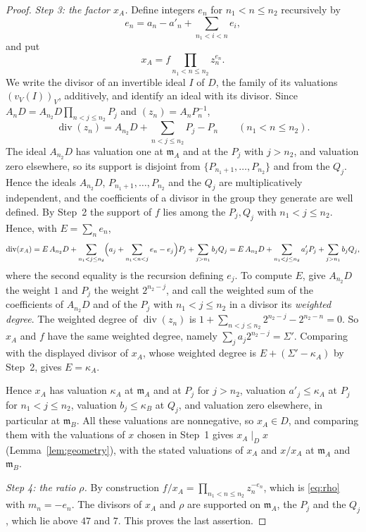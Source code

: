 \documentclass[11pt]{article}
\theoremstyle{plain}
\theoremstyle{definition}
\theoremstyle{remark}
\DeclareMathOperator{\divi}{div}
\newcommand{\EA}{\mathfrak m_A}
\newcommand{\EB}{\mathfrak m_B}
\begin{document}
\begin{proof}
\emph{Step 3: the factor $x_A$.}  Define integers $e_n$ for
$n_1<n\le n_2$ recursively by
\[
 e_n=a_n-a'_n+\sum_{n_1<i<n}e_i,
\]
and put
\[
 x_A=f\prod_{n_1<n\le n_2}z_n^{e_n}.
\]
We write the divisor of an invertible ideal $I$ of $D$, the family of its
valuations $(v_V(I))_V$, additively, and identify an ideal with its
divisor.  Since $A_nD=A_{n_2}D\prod_{n<j\le n_2}P_j$ and
$(z_n)=A_nP_n^{-1}$,
\[
 \divi(z_n)=A_{n_2}D+\sum_{n<j\leq n_2}P_j-P_n\qquad(n_1<n\leq n_2).
\]
The ideal $A_{n_2}D$ has valuation one at $\EA$ and at the $P_j$ with
$j>n_2$, and valuation zero elsewhere, so its support is disjoint from
$\{P_{n_1+1},\ldots,P_{n_2}\}$ and from the $Q_j$.  Hence the ideals
$A_{n_2}D$, $P_{n_1+1},\ldots,P_{n_2}$ and the $Q_j$ are multiplicatively
independent, and the coefficients of a divisor in the group they generate
are well defined.  By Step~2 the support of $f$ lies among
the $P_j,Q_j$ with $n_1<j\le n_2$.  Hence, with $E=\sum_ne_n$,
\[
 \divi(x_A)=E\,A_{n_2}D
   +\sum_{n_1<j\le n_2}\Bigl(a_j+\sum_{n_1<n<j}e_n-e_j\Bigr)P_j
   +\sum_{j>n_1}b_jQ_j
   =E\,A_{n_2}D+\sum_{n_1<j\le n_2}a'_jP_j+\sum_{j>n_1}b_jQ_j,
\]
where the second equality is the recursion defining $e_j$.  To compute
$E$, give $A_{n_2}D$ the weight $1$ and $P_j$ the weight $2^{n_2-j}$, and
call the weighted sum of the coefficients of $A_{n_2}D$ and of the $P_j$
with $n_1<j\le n_2$ in a divisor its \emph{weighted degree}.  The weighted degree of
$\divi(z_n)$ is $1+\sum_{n<j\le n_2}2^{n_2-j}-2^{n_2-n}=0$.  So $x_A$ and
$f$ have the same weighted degree, namely
$\sum_ja_j2^{n_2-j}=\Sigma'$.  Comparing with the displayed divisor of
$x_A$, whose weighted degree is $E+(\Sigma'-\kappa_A)$ by Step~2, gives
$E=\kappa_A$.

Hence $x_A$ has valuation $\kappa_A$ at $\EA$ and at $P_j$ for $j>n_2$,
valuation $a'_j\le\kappa_A$ at $P_j$ for $n_1<j\le n_2$, valuation
$b_j\le\kappa_B$ at $Q_j$, and valuation zero elsewhere, in particular at
$\EB$.  All these valuations are nonnegative, so $x_A\in D$, and
comparing them with the valuations of $x$ chosen in Step~1 gives
$x_A\mid_Dx$ (Lemma~\ref{lem:geometry}), with the stated valuations of
$x_A$ and $x/x_A$ at $\EA$ and $\EB$.

\emph{Step 4: the ratio $\rho$.}  By construction
$f/x_A=\prod_{n_1<n\le n_2}z_n^{-e_n}$, which is \eqref{eq:rho} with
$m_n=-e_n$.  The divisors of $x_A$ and $\rho$ are supported on $\EA$, the
$P_j$ and the $Q_j$, which lie above $47$ and $7$.  This proves the last
assertion.
\end{proof}
\end{document}

